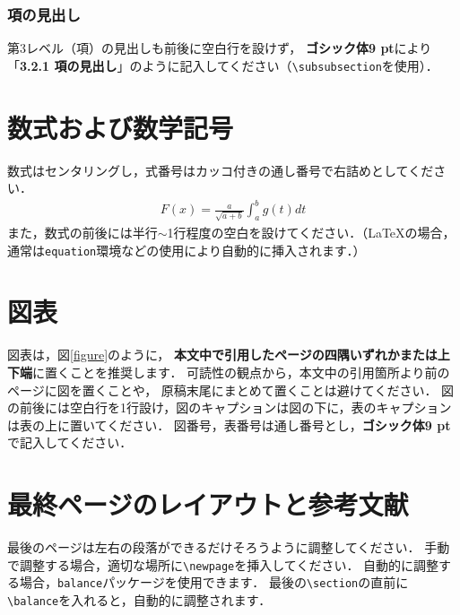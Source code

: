 \documentclass[a4paper]{jarticle}
\begin{document}
\subsubsection{項の見出し}

第3レベル（項）の見出しも前後に空白行を設けず，
{\bf ゴシック体9 pt}により「{\bf 3.2.1 項の見出し}」のように記入してください（\verb+\subsubsection+を使用）．

\section{数式および数学記号}%

数式はセンタリングし，式番号はカッコ付きの通し番号で右詰めとしてください．
\begin{align}
  F(x) = \frac{a}{\sqrt{a+b}}\int_a^b{g(t)}dt
\end{align}
また，数式の前後には半行$\sim$1行程度の空白を設けてください．（\LaTeX の場合，
通常は\verb+equation+環境などの使用により自動的に挿入されます．）

\section{図表}%

図表は，図\ref{figure}のように，
{\bf 本文中で引用したページの四隅いずれかまたは上下端}に置くことを推奨します．
可読性の観点から，本文中の引用箇所より前のページに図を置くことや，
原稿末尾にまとめて置くことは避けてください．
図の前後には空白行を1行設け，図のキャプションは図の下に，表のキャプションは表の上に置いてください．
図番号，表番号は通し番号とし，{\bf ゴシック体9 pt}で記入してください．


\section{最終ページのレイアウトと参考文献}

最後のページは左右の段落ができるだけそろうように調整してください．
手動で調整する場合，適切な場所に\verb+\newpage+を挿入してください．
自動的に調整する場合，\verb+balance+パッケージを使用できます．
最後の\verb+\section+の直前に\verb+\balance+を入れると，自動的に調整されます．
\end{document}

